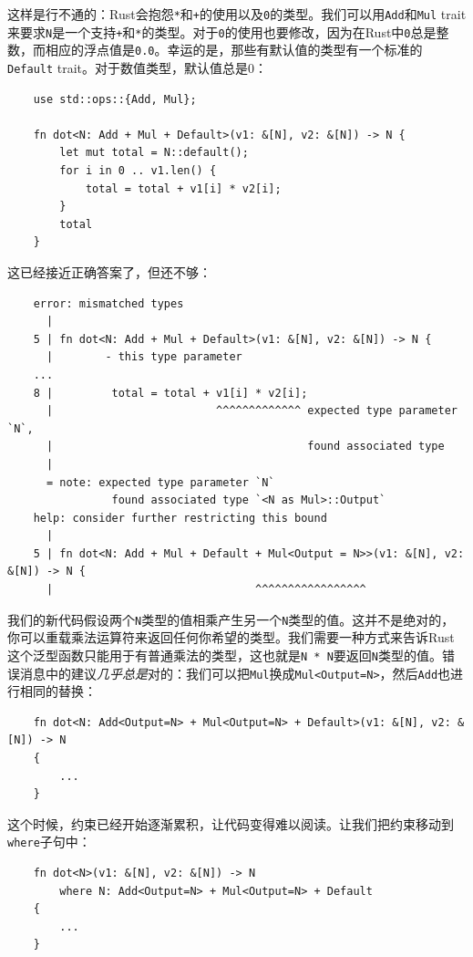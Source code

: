 这样是行不通的：Rust会抱怨\texttt{*}和\texttt{+}的使用以及\texttt{0}的类型。我们可以用\texttt{Add}和\texttt{Mul} trait来要求\texttt{N}是一个支持\texttt{+}和\texttt{*}的类型。对于\texttt{0}的使用也要修改，因为在Rust中\texttt{0}总是整数，而相应的浮点值是\texttt{0.0}。幸运的是，那些有默认值的类型有一个标准的\texttt{Default} trait。对于数值类型，默认值总是0：
\begin{verbatim}
    use std::ops::{Add, Mul};

    fn dot<N: Add + Mul + Default>(v1: &[N], v2: &[N]) -> N {
        let mut total = N::default();
        for i in 0 .. v1.len() {
            total = total + v1[i] * v2[i];
        }
        total
    }
\end{verbatim}

这已经接近正确答案了，但还不够：
\begin{verbatim}
    error: mismatched types
      |
    5 | fn dot<N: Add + Mul + Default>(v1: &[N], v2: &[N]) -> N {
      |        - this type parameter
    ...
    8 |         total = total + v1[i] * v2[i];
      |                         ^^^^^^^^^^^^^ expected type parameter `N`,
      |                                       found associated type
      |
      = note: expected type parameter `N`
                found associated type `<N as Mul>::Output`
    help: consider further restricting this bound
      |
    5 | fn dot<N: Add + Mul + Default + Mul<Output = N>>(v1: &[N], v2: &[N]) -> N {
      |                               ^^^^^^^^^^^^^^^^^
\end{verbatim}

我们的新代码假设两个\texttt{N}类型的值相乘产生另一个\texttt{N}类型的值。这并不是绝对的，你可以重载乘法运算符来返回任何你希望的类型。我们需要一种方式来告诉Rust这个泛型函数只能用于有普通乘法的类型，这也就是\texttt{N * N}要返回\texttt{N}类型的值。错误消息中的建议\emph{几乎总是}对的：我们可以把\texttt{Mul}换成\texttt{Mul<Output=N>}，然后\texttt{Add}也进行相同的替换：
\begin{verbatim}
    fn dot<N: Add<Output=N> + Mul<Output=N> + Default>(v1: &[N], v2: &[N]) -> N
    {
        ...
    }
\end{verbatim}

这个时候，约束已经开始逐渐累积，让代码变得难以阅读。让我们把约束移动到\texttt{where}子句中：
\begin{verbatim}
    fn dot<N>(v1: &[N], v2: &[N]) -> N
        where N: Add<Output=N> + Mul<Output=N> + Default
    {
        ...
    }
\end{verbatim}

